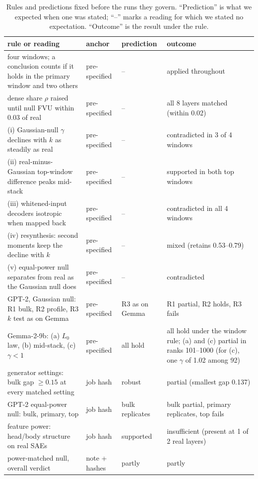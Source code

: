 \documentclass[10pt,twocolumn]{article}
\newcommand{\Lz}{L_0}
\begin{document}
\begin{table}[!htb]
\centering
\caption{Rules and predictions fixed before the runs they govern. ``Prediction'' is what we expected when one was stated; ``--'' marks a reading for which we stated no expectation. ``Outcome'' is the result under the rule.}
\label{tab:prereg}
\footnotesize
\setlength{\tabcolsep}{3pt}
\begin{tabular}{p{4.6cm} p{2.0cm} p{2.6cm} p{6.4cm}}
\toprule
rule or reading & anchor & prediction & outcome \\
\midrule
four windows; a conclusion counts if it holds in the primary window and two others & pre-specified & -- & applied throughout \\
dense share $\rho$ raised until null FVU within 0.03 of real & pre-specified & -- & all 8 layers matched (within 0.02) \\
(i) Gaussian-null $\gamma$ declines with $k$ as steadily as real & pre-specified & -- & contradicted in 3 of 4 windows \\
(ii) real-minus-Gaussian top-window difference peaks mid-stack & pre-specified & -- & supported in both top windows \\
(iii) whitened-input decoders isotropic when mapped back & pre-specified & -- & contradicted in all 4 windows \\
(iv) resynthesis: second moments keep the decline with $k$ & pre-specified & -- & mixed (retains 0.53--0.79) \\
(v) equal-power null separates from real as the Gaussian null does & pre-specified & -- & contradicted \\
GPT-2, Gaussian null: R1 bulk, R2 profile, R3 $k$ test as on Gemma & pre-specified & R3 as on Gemma & R1 partial, R2 holds, R3 fails \\
Gemma-2-9b: (a) $\Lz$ law, (b) mid-stack, (c) $\gamma<1$ & pre-specified & all hold & all hold under the window rule; (a) and (c) partial in ranks 101--1000 (for (c), one $\gamma$ of 1.02 among 92) \\
generator settings: bulk gap $\ge 0.15$ at every matched setting & job hash & robust & partial (smallest gap 0.137) \\
GPT-2 equal-power null: bulk, primary, top & job hash & bulk replicates & bulk partial, primary replicates, top fails \\
feature power: head/body structure on real SAEs & job hash & supported & insufficient (present at 1 of 2 real layers) \\
power-matched null, overall verdict & note + hashes & partly & partly \\

\end{tabular}
\end{table}
\end{document}
